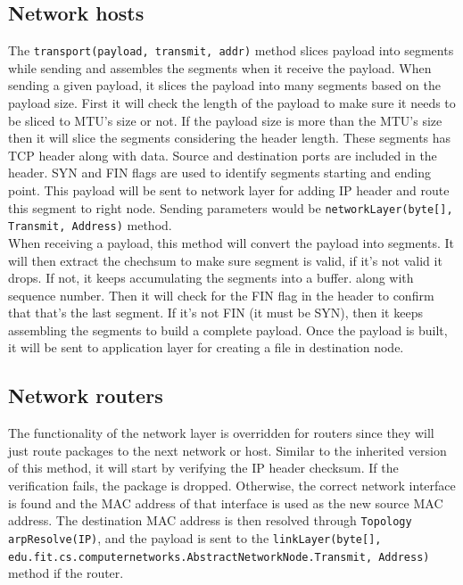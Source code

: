 \documentclass{scrartcl}
\begin{document}
\subsection{Network hosts}
The \texttt{transport(payload, transmit, addr)} method slices payload into segments while sending and assembles the segments when it receive the payload. When sending a given payload, it slices the payload into many segments based on the payload size. First it will check the length of the payload to make sure it needs to be sliced to MTU's size or not. If the payload size is more than the MTU's size then it will slice the segments considering the header length. These segments has TCP header along with data. Source and destination ports are included in the header. SYN and FIN flags are used to identify segments starting and ending point. This payload will be sent to network layer for adding IP header and route this segment to right node. Sending parameters would be \texttt{networkLayer(byte[], Transmit, Address)} method. \\

When receiving a payload, this method will convert the payload into segments. It will then extract the chechsum to make sure segment is valid, if it's not valid it drops. If not, it keeps accumulating the segments into a buffer. along with sequence number. Then it will check for the FIN flag in the header to confirm that that's the last segment. If it's not FIN (it must be SYN), then it keeps assembling the segments to build a complete payload. Once the payload is built, it will be sent to application layer for creating a file in destination node.


\subsection{Network routers}
The functionality of the network layer is overridden for routers since they will just route packages to the next network or host. Similar to the inherited version of this method, it will start by verifying the IP header checksum. If the verification fails, the package is dropped. Otherwise, the correct network interface is found and the MAC address of that interface is used as the new source MAC address. The destination MAC address is then resolved through \texttt{Topology arpResolve(IP)},  and the payload is sent to the \texttt{linkLayer(byte[], edu.fit.cs.computernetworks.AbstractNetworkNode.Transmit, Address)} method if the router.
\end{document}
